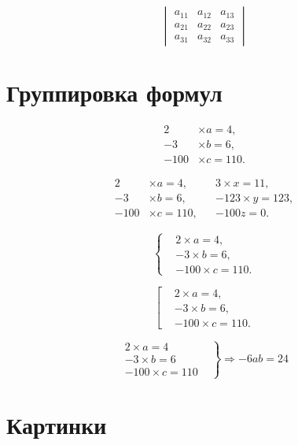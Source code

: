 \documentclass[a4paper,12pt]{article} %
\begin{document}
\[ \begin{vmatrix}
a_{11} & a_{12} & a_{13} \\
a_{21} & a_{22} & a_{23} \\
a_{31} & a_{32} & a_{33}
\end{vmatrix} \]

\section{Группировка формул}

\begin{equation}
\begin{aligned}
2 &\times a=4,\\
-3 &\times b = 6,\\
-100 &\times c = 110.
\end{aligned}
\end{equation}

\begin{equation}
\begin{aligned}
2 &\times a=4, & &3 \times x=11,\\
-3 &\times b = 6, & &-123 \times y =123,\\
-100 &\times c = 110, & &-100z=0. 
\end{aligned}
\end{equation}

\[  \left\{
\begin{aligned}
&2 \times a=4,\\
&-3 \times b = 6,\\
&-100 \times c = 110.
\end{aligned} \right.
\]

\[  \left[
\begin{aligned}
&2 \times a=4,\\
&-3 \times b = 6,\\
&-100 \times c = 110.
\end{aligned} \right.
\]

\[  \left.
\begin{aligned}
2 \times a=4&\\
-3 \times b = 6&\\
-100 \times c = 110&
\end{aligned} \right\} \Rightarrow -6ab=24
\]

\section{Картинки}
\end{document}
